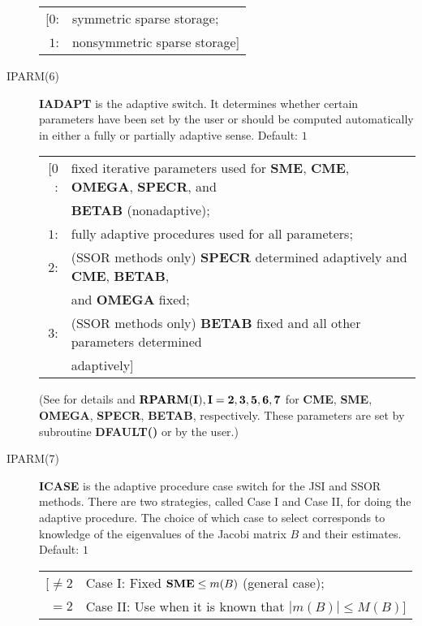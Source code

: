 \begin{description}
                 \begin{tabular}{rl} 
                 [$0$: & symmetric sparse storage; \\
                  $1$: & nonsymmetric sparse storage]
                 \end{tabular} 
 
 \item[IPARM(6)] {\bf IADAPT} is the adaptive switch.  It determines 
                 whether certain parameters have been set by the user or 
                 should be computed automatically in either a fully 
                 or partially adaptive sense. Default: $1$
 
                 \begin{tabular}{rl}
                 [$0$: & fixed iterative parameters used for {\bf SME}, 
                         {\bf CME}, {\bf OMEGA}, {\bf SPECR}, and \\
                       & {\bf BETAB} (nonadaptive); \\
                  $1$: & fully adaptive procedures used for all parameters; \\
                  $2$: & (SSOR methods only) {\bf SPECR} determined 
                         adaptively and {\bf CME}, {\bf BETAB},\\
                       & and {\bf OMEGA} fixed; \\
                  $3$: & (SSOR methods only) {\bf BETAB} fixed and all other
                         parameters determined \\
                       & adaptively]
                 \end{tabular} 

                 \noindent
                 (See \cite{4,6} for details and ${\bf RPARM(I), I=2,3,5,6,7}$ 
                 for {\bf CME}, {\bf SME}, {\bf OMEGA}, {\bf SPECR}, 
                 {\bf BETAB}, respectively.  These parameters are set
                 by subroutine {\bf DFAULT()} or by the user.)

 \item[IPARM(7)] {\bf ICASE} is the adaptive procedure case switch for the
                 JSI and SSOR methods.  There are two strategies, called 
                 Case I and Case II, for doing the adaptive procedure.
                 The choice of which case to select corresponds to knowledge 
                 of the eigenvalues of the Jacobi matrix $B$ and their 
                 estimates.  Default: $1$
 
                 \begin{tabular}{rl}
                 [$\neq 2$ & Case I: Fixed ${\bf SME} \leq m(B)$ 
                                      (general case); \\
                  $=2$     & Case II: Use when it is known that
                                  $|m(B)| \leq M(B)]$ 
                 \end{tabular}


\end{description}
